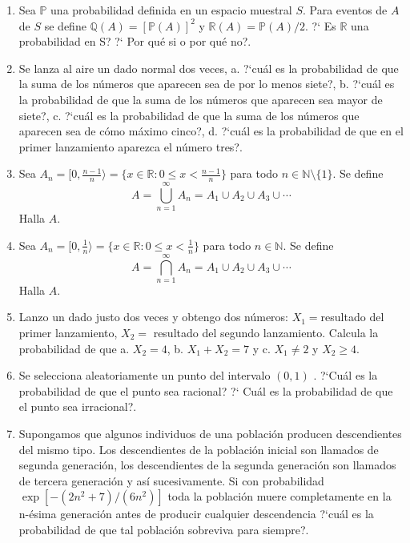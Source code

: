 \documentclass[a4paper,11pt]{report}
\begin{document}
\begin{enumerate}
\item  Sea $\mathbb{P}$ una probabilidad definida en un espacio muestral $S$. Para eventos de $A$ de $S$ se define $\mathbb{Q}(A) = [\mathbb{P}(A)]^2$  y $\mathbb{R}(A) = \mathbb{P}(A)/2$. ?` Es $\mathbb{R}$ una probabilidad en S? ?` Por qu\'e si  o por qu\'e no?.

\item Se lanza al aire un dado normal dos veces, a. ?`cu\'al es la probabilidad de que la suma de los n\'umeros que aparecen sea de por lo menos siete?, b. ?`cu\'al es la probabilidad de que la suma de los n\'umeros que aparecen sea mayor de siete?, c. ?`cu\'al es la probabilidad de que la suma de los n\'umeros que aparecen sea de c\'omo m\'aximo cinco?, d. ?`cu\'al es la probabilidad de que en el primer lanzamiento aparezca el n\'umero tres?.

\item Sea $A_n=[0,\frac{n-1}{n}\rangle=\{x\in\mathbb{R}:0\leq x< \frac{n-1}{n} \}$ para todo $n\in\mathbb{N}\setminus\{1\}$. Se define 
$$A=\bigcup_{n=1}^{\infty}A_n=A_1\cup A_2\cup A_3\cup \cdots$$
Halla $A$.
\item  Sea $A_n=[0,\frac{1}{n}\rangle=\{x\in\mathbb{R}:0\leq x< \frac{1}{n} \}$ para todo $n\in\mathbb{N}$. Se define 
$$A=\bigcap_{n=1}^{\infty}A_n=A_1\cup A_2\cup A_3\cup \cdots$$
Halla $A$.
\item Lanzo un dado justo dos veces y obtengo dos n\'umeros: $X_1 =$resultado del primer lanzamiento, $X_2 =$ resultado del segundo lanzamiento. Calcula la probabilidad de que a. $X_2=4$, b. $X_1+X_2=7$ y c. $X_1\neq 2$ y $X_2\geq 4$.

\item Se selecciona aleatoriamente un punto del intervalo $(0,1)$ . ?`Cu\'al es la probabilidad de que el punto sea racional? ?` Cu\'al es la probabilidad de que el punto sea irracional?.

\item  Supongamos que algunos individuos de una poblaci\'on producen descendientes del mismo tipo. Los descendientes de la poblaci\'on inicial son llamados de segunda generaci\'on, los descendientes de la segunda generaci\'on son llamados de tercera generaci\'on y as\'i sucesivamente. Si con probabilidad $\exp[-(2n^2 + 7)/(6n^2)]$ toda la poblaci\'on muere completamente en la n-\'esima generaci\'on  antes de producir cualquier descendencia ?`cu\'al es la probabilidad de que tal poblaci\'on sobreviva para siempre?.
\end{enumerate}
\end{document}
